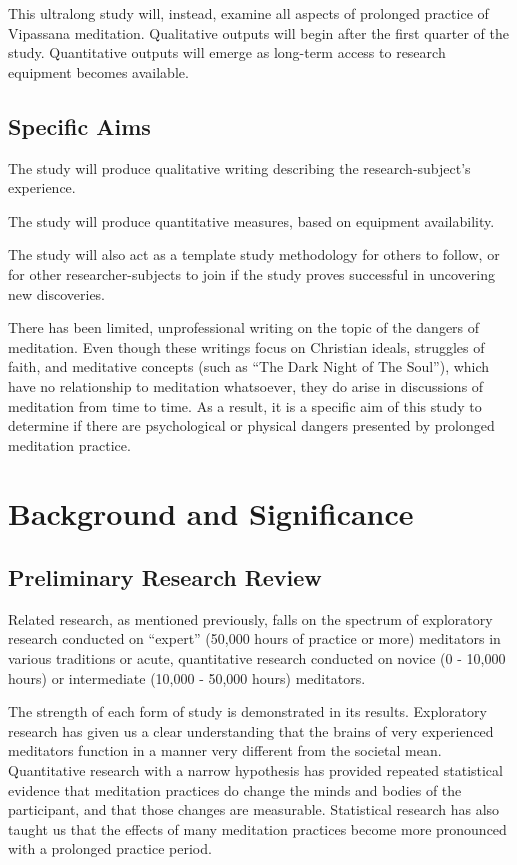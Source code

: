 \documentclass[a4paper, amsfonts, amssymb, amsmath, reprint, showkeys, nofootinbib, twoside]{revtex4-1}
\begin{document}
This ultralong study will, instead, examine all aspects of prolonged practice of
Vipassana meditation.
Qualitative outputs will begin after the first quarter of the study.
Quantitative outputs will emerge as long-term access to research equipment becomes available.

\subsection{Specific Aims}

The study will produce qualitative writing describing the research-subject's experience.

The study will produce quantitative measures, based on equipment availability.

The study will also act as a template study methodology for others to follow,
or for other researcher-subjects to join if the study proves successful in
uncovering new discoveries.

There has been limited, unprofessional writing on the topic of the dangers of meditation.
\cite{ingram2020mastering,https://doi.org/10.1080/03060497.1983.11084578}
Even though these writings focus on Christian ideals, struggles of faith,
and meditative concepts (such as ``The Dark Night of The Soul''),
which have no relationship to meditation whatsoever,
they do arise in discussions of meditation from time to time.
As a result, it is a specific aim of this study to determine if there are
psychological or physical dangers presented by prolonged meditation practice.

\section{Background and Significance}

\subsection{Preliminary Research Review}

Related research, as mentioned previously, falls on the spectrum of exploratory
research conducted on ``expert'' (50,000 hours of practice or more) meditators
in various traditions or acute, quantitative research conducted on novice
(0 - 10,000 hours) or intermediate (10,000 - 50,000 hours) meditators.

The strength of each form of study is demonstrated in its results.
Exploratory research has given us a clear understanding that the brains of
very experienced meditators function in a manner very different from the
societal mean.
Quantitative research with a narrow hypothesis has provided repeated
statistical evidence that meditation practices do change the minds and bodies
of the participant, and that those changes are measurable.
Statistical research has also taught us that the effects of many
meditation practices become more pronounced with a prolonged practice period.
\end{document}
